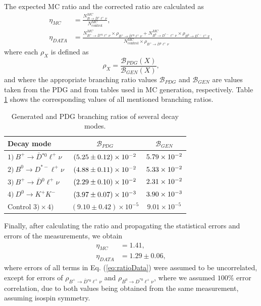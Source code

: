 The expected MC ratio and the corrected ratio are calculated as
\begin{align}
\eta_{MC} &= \frac{N^{MC}_{B \to \bar D {}^* \ell^+ \nu}}{N^{MC}_{\mathrm{control}}},\\
\eta_{DATA} &= \frac{N^{MC}_{B^+ \to \bar D {}^{*0} \ell^+ \nu}\times \rho_{B^+ \to \bar D {}^{*0} \ell^+ \nu} + N^{MC}_{B^0 \to D^{*-} \ell^+ \nu}\times \rho_{B^0 \to D^{*-} \ell^+ \nu}}{N^{MC}_{\mathrm{control}}\times \rho_{B^+ \to \bar D {}^{0} \ell^+ \nu}},
\label{eq:ratioData}
\end{align}
where each $\rho_X$ is defined as 
\begin{equation*}
\rho_X = \frac{\mathcal{B}_{PDG}(X)}{\mathcal{B}_{GEN}(X)},
\end{equation*}
and where the appropriate branching ratio values $\mathcal{B}_{PDG}$ and $\mathcal{B}_{GEN}$ are values taken from the PDG \cite{tanabashi2018review} and from tables used in MC generation, respectively. Table \ref{tab:br} shows the corresponding values of all mentioned branching ratios.

\begin{table}[H]
	\centering
\begin{tabular}{|l|c|c|}
	\hline
	Decay mode & $\mathcal{B}_{PDG}$ & $\mathcal{B}_{GEN}$ \\
	\hline
	$1)~B^+ \to \bar D {}^{*0} \ell^+ \nu$ & $(5.25\pm0.12)\times 10^{-2}$ & $5.79\times 10^{-2}$ \\
	$2)~B^0 \to D^{*-} \ell^+ \nu$ & $(4.88\pm0.11)\times 10^{-2}$ & $5.33\times 10^{-2}$ \\
	$3)~B^+ \to \bar D {}^0 \ell^+ \nu$ & $(2.29\pm0.10)\times 10^{-2}$ & $2.31\times 10^{-2}$ \\
	$4)~D^0 \to K^+ K^-$ & $(3.97\pm0.07)\times 10^{-3}$ & $3.90\times 10^{-3}$ \\
	\hline
	Control $3) \times 4)$ & $(9.10\pm0.42)\times 10^{-5}$ & $9.01\times 10^{-5}$ \\
	\hline
\end{tabular}
	\caption{Generated and PDG branching ratios of several decay modes.}
	\label{tab:br}
\end{table}

Finally, after calculating the ratio and propagating the statistical errors and errors of the measurements, we obtain
\begin{align*}
\eta_{MC} &= 1.41,\\
\eta_{DATA} &= 1.29\pm 0.06,
\end{align*}
where errors of all terms in Eq. (\ref{eq:ratioData}) were assumed to be uncorrelated, except for errors of $\rho_{B^+ \to \bar D {}^{*0} \ell^+ \nu}$ and $\rho_{B^0 \to D^{*0} \ell^+ \nu}$, where we assumed $100\%$ error correlation, due to both values being obtained from the same measurement, assuming isospin symmetry.


